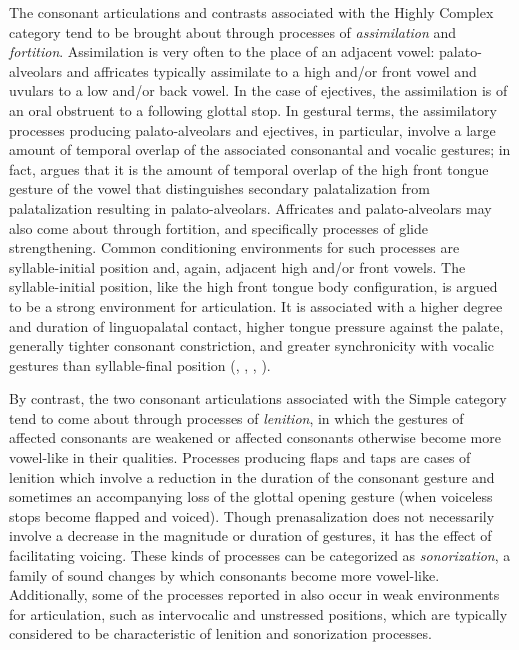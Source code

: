   The consonant articulations and contrasts associated with the Highly Complex category tend to be brought about through processes of \textit{assimilation} and \textit{fortition}. Assimilation is very often to the place of an adjacent vowel: palato-alveolars and affricates typically assimilate to a high and/or front vowel and uvulars to a low and/or back vowel. In the case of ejectives, the assimilation is of an oral obstruent to a following glottal stop. In gestural terms, the assimilatory processes producing palato-alveolars and ejectives, in particular, involve a large amount of temporal overlap of the associated consonantal and vocalic gestures; in fact, \citet{Bateman2007} argues that it is the amount of temporal overlap of the high front tongue gesture of the vowel that distinguishes secondary palatalization from palatalization resulting in palato-alveolars. Affricates and palato-alveolars may also come about through fortition, and specifically processes of glide strengthening. Common conditioning environments for such processes are syllable-initial position and, again, adjacent high and/or front vowels. The syllable-initial position, like the high front tongue body configuration, is argued to be a strong environment for articulation. It is associated with a higher degree and duration of linguopalatal contact, higher tongue pressure against the palate, generally tighter consonant constriction, and greater synchronicity with vocalic gestures than syllable-final position (\citealt{Byrd1996b}, \citealt{Fougeron1999}, \citealt{KeatingEtAl2003}, \citealt{GoldsteinEtAl2006}).



  By contrast, the two consonant articulations associated with the Simple category tend to come about through processes of \textit{lenition}, in which the gestures of affected consonants are weakened or affected consonants otherwise become more vowel-like in their qualities. Processes producing flaps and taps are cases of lenition which involve a reduction in the duration of the consonant gesture and sometimes an accompanying loss of the glottal opening gesture (when voiceless stops become flapped and voiced). Though prenasalization does not necessarily involve a decrease in the magnitude or duration of gestures, it has the effect of facilitating voicing. These kinds of processes can be categorized as \textit{sonorization}, a family of sound changes by which consonants become more vowel-like. Additionally, some of the processes reported in  also occur in weak environments for articulation, such as intervocalic and unstressed positions, which are typically considered to be characteristic of lenition and sonorization processes.



